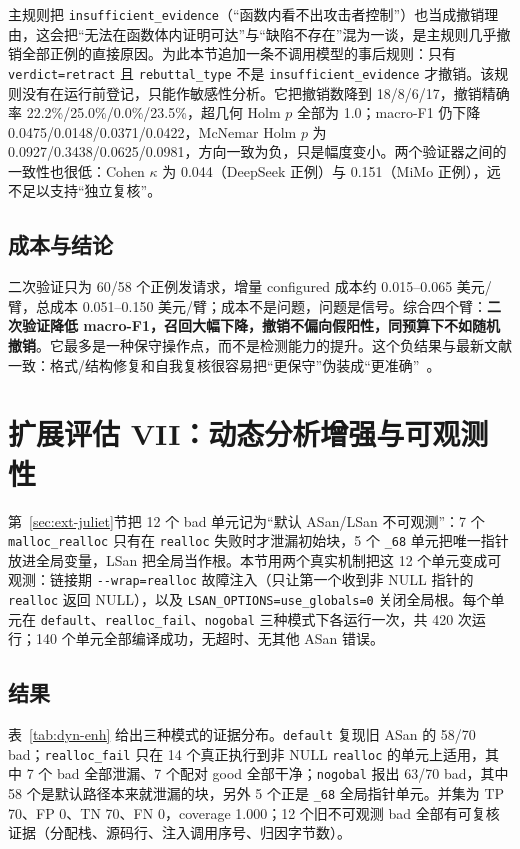 \documentclass[conference]{IEEEtran}
\begin{document}
主规则把 \texttt{insufficient\_evidence}（“函数内看不出攻击者控制”）也当成撤销理由，这会把“无法在函数体内证明可达”与“缺陷不存在”混为一谈，是主规则几乎撤销全部正例的直接原因。为此本节追加一条不调用模型的事后规则：只有 \texttt{verdict=retract} 且 \texttt{rebuttal\_type} 不是 \texttt{insufficient\_evidence} 才撤销。该规则没有在运行前登记，只能作敏感性分析。它把撤销数降到 18/8/6/17，撤销精确率 22.2\%/25.0\%/0.0\%/23.5\%，超几何 Holm $p$ 全部为 1.0；macro-F1 仍下降 0.0475/0.0148/0.0371/0.0422，McNemar Holm $p$ 为 0.0927/0.3438/0.0625/0.0981，方向一致为负，只是幅度变小。两个验证器之间的一致性也很低：Cohen $\kappa$ 为 0.044（DeepSeek 正例）与 0.151（MiMo 正例），远不足以支持“独立复核”。

\subsection{成本与结论}

二次验证只为 60/58 个正例发请求，增量 configured 成本约 0.015--0.065 美元/臂，总成本 0.051--0.150 美元/臂；成本不是问题，问题是信号。综合四个臂：\textbf{二次验证降低 macro-F1，召回大幅下降，撤销不偏向假阳性，同预算下不如随机撤销}。它最多是一种保守操作点，而不是检测能力的提升。这个负结果与最新文献一致：格式/结构修复和自我复核很容易把“更保守”伪装成“更准确”~\cite{chen2026calibrationfloor,nguyen2026constrained}。

\section{扩展评估 VII：动态分析增强与可观测性}
\label{sec:dyn-enh}

第~\ref{sec:ext-juliet}节把 12 个 bad 单元记为“默认 ASan/LSan 不可观测”：7 个 \texttt{malloc\_realloc} 只有在 \texttt{realloc} 失败时才泄漏初始块，5 个 \texttt{\_68} 单元把唯一指针放进全局变量，LSan 把全局当作根。本节用两个真实机制把这 12 个单元变成可观测：链接期 \texttt{-{}-wrap=realloc} 故障注入（只让第一个收到非 NULL 指针的 \texttt{realloc} 返回 NULL），以及 \texttt{LSAN\_OPTIONS=use\_globals=0} 关闭全局根。每个单元在 \texttt{default}、\texttt{realloc\_fail}、\texttt{nogobal} 三种模式下各运行一次，共 420 次运行；140 个单元全部编译成功，无超时、无其他 ASan 错误。

\subsection{结果}

表~\ref{tab:dyn-enh} 给出三种模式的证据分布。\texttt{default} 复现旧 ASan 的 58/70 bad；\texttt{realloc\_fail} 只在 14 个真正执行到非 NULL \texttt{realloc} 的单元上适用，其中 7 个 bad 全部泄漏、7 个配对 good 全部干净；\texttt{nogobal} 报出 63/70 bad，其中 58 个是默认路径本来就泄漏的块，另外 5 个正是 \texttt{\_68} 全局指针单元。并集为 TP 70、FP 0、TN 70、FN 0，coverage 1.000；12 个旧不可观测 bad 全部有可复核证据（分配栈、源码行、注入调用序号、归因字节数）。
\end{document}
